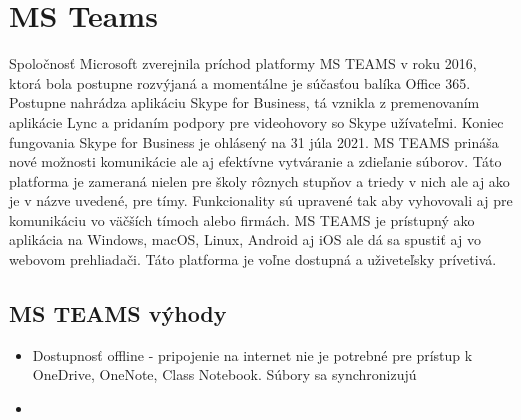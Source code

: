 \documentclass[10pt,twoside,slovak,a4paper]{article}
\begin{document}
\section{MS Teams} \label{MS Teams}
Spoločnosť Microsoft zverejnila príchod platformy MS TEAMS v roku 2016, ktorá bola postupne rozvýjaná a momentálne je súčasťou balíka Office 365. Postupne nahrádza aplikáciu Skype for Business, tá vznikla z premenovaním aplikácie Lync a pridaním podpory pre videohovory so Skype užívateľmi. Koniec fungovania Skype for Business je ohlásený na 31 júla 2021. MS TEAMS prináša nové možnosti komunikácie ale aj efektívne vytváranie a zdieľanie súborov. Táto platforma je zameraná nielen pre školy rôznych stupňov a triedy v nich ale aj ako je v názve uvedené, pre tímy. Funkcionality sú upravené tak aby vyhovovali aj pre komunikáciu vo väčších tímoch alebo firmách. MS TEAMS je prístupný ako aplikácia na Windows, macOS, Linux, Android aj iOS ale dá sa spustiť aj vo webovom prehliadači. Táto platforma je voľne dostupná a uživeteľsky prívetivá. \cite {MS-TEAMS}

\subsection{MS TEAMS výhody} \label{MS TEAMS: MS TEAMS výhody}

\begin{itemize}
	\item Dostupnosť offline - pripojenie na internet nie je potrebné pre prístup k OneDrive, OneNote, Class Notebook. Súbory sa synchronizujú
 	\item 
	\end{itemize}







\end{document}
